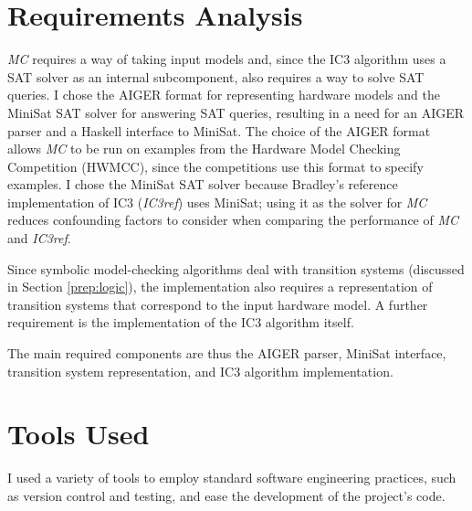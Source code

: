 \documentclass[12pt,a4paper,twoside,openright]{report}
\begin{document}
\section{Requirements Analysis}
\label{prep:requirements}


\emph{MC} requires a way of taking input models and, since
the IC3 algorithm uses a SAT solver as an internal subcomponent, also
requires a way to solve SAT queries.
I chose the AIGER format for representing hardware models and the
MiniSat SAT solver for answering SAT queries, resulting in a need for an
AIGER parser and a Haskell interface to MiniSat. The choice of
the AIGER format allows \emph{MC} to be run on examples from
the Hardware Model Checking Competition (HWMCC), since the competitions
use this format to specify examples. I chose the MiniSat SAT
solver because Bradley's reference implementation of IC3 (\emph{IC3ref})
\cite{refic3} uses MiniSat; using it as the solver for \emph{MC}
reduces confounding factors to consider when comparing the performance
of \emph{MC} and \emph{IC3ref}.

Since symbolic model-checking algorithms deal with transition systems
(discussed in Section \ref{prep:logic}), the implementation also requires a representation of
transition systems that correspond to the input hardware model.
A further requirement is the implementation of the
IC3 algorithm itself.

The main required components are thus the AIGER parser, MiniSat interface,
transition system representation, and IC3 algorithm implementation.

\section{Tools Used}
\label{prep:tools}

I used a variety of tools to employ standard software engineering practices, such
as version control and testing, and ease the development of
the project's code.
\end{document}
